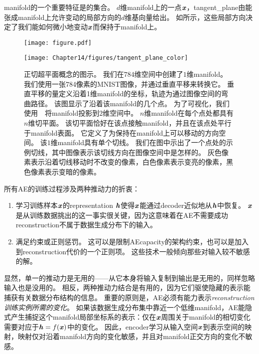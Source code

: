 \gls{manifold}的一个重要特征是的集合。
$d$维\gls{manifold}上的一点$\boldsymbol{\mathit{x}}$，\gls{tangent_plane}由能张成\gls{manifold}上允许变动的局部方向的$d$维基向量给出。
如所示，这些局部方向决定了我们能如何微小地变动$\boldsymbol{\mathit{x}}$而保持于\gls{manifold}上。

\begin{figure}[!htb]
\ifOpenSource
\centerline{\texttt{[image: figure.pdf]}}
\else
\centerline{\texttt{[image: Chapter14/figures/tangent\_plane\_color]}}
\fi
\caption{正切超平面概念的图示。
我们在$784$维空间中创建了$1$维\gls{manifold}。
我们使用一张784像素的MNIST图像，并通过垂直平移来转换它。
垂直平移的量定义沿着1维\gls{manifold}的坐标，轨迹为通过图像空间的弯曲路径。
该图显示了沿着该\gls{manifold}的几个点。
为了可视化，我们使用~~将\gls{manifold}投影到$2$维空间中。
$n$维\gls{manifold}在每个点处都具有$n$维切平面。
该切平面恰好在该点接触\gls{manifold}，并且在该点处平行于\gls{manifold}表面。
它定义了为保持在\gls{manifold}上可以移动的方向空间。
该$1$维\gls{manifold}具有单个切线。
我们在图中示出了一个点处的示例切线，其中图像表示该切线方向在图像空间中是怎样的。
灰色像素表示沿着切线移动时不改变的像素，白色像素表示变亮的像素，黑色像素表示变暗的像素。
}
\label{fig:chap14_tangent_plane_color}
\end{figure}


所有\gls{AE}的训练过程涉及两种推动力的折衷：
\begin{enumerate}
 \item 学习训练样本$\boldsymbol{\mathit{x}}$的\gls{representation} $\boldsymbol{\mathit{h}}$使得$\boldsymbol{\mathit{x}}$能通过\gls{decoder}近似地从$\boldsymbol{\mathit{h}}$中恢复。
$\boldsymbol{\mathit{x}}$是从训练数据挑出的这一事实很关键，因为这意味着在\gls{AE}不需要成功\gls{reconstruction}不属于数据生成分布下的输入。
 \item 满足约束或正则惩罚。
这可以是限制\gls{AE}\gls{capacity}的架构约束，也可以是加入到\gls{reconstruction}代价的一个正则项。
这些技术一般倾向那些对输入较不敏感的解。
\end{enumerate}


显然，单一的推动力是无用的——从它本身将输入复制到输出是无用的，同样忽略输入也是没用的。
相反，两种推动力结合是有用的，因为它们驱使隐藏的表示能捕获有关数据分布结构的信息。
重要的原则是，\gls{AE}必须有能力表示\emph{\gls{reconstruction}训练实例所需的变化}。
如果该数据生成分布集中靠近一个低维\gls{manifold}，\gls{AE}能隐式产生捕捉这个\gls{manifold}局部坐标系的表示：仅在$\boldsymbol{\mathit{x}}$周围关于\gls{manifold}的相切变化需要对应于$\boldsymbol{\mathit{h}}=f(\boldsymbol{\mathit{x}})$中的变化。
因此，\gls{encoder}学习从输入空间$\boldsymbol{\mathit{x}}$到表示空间的映射，映射仅对沿着\gls{manifold}方向的变化敏感，并且对\gls{manifold}正交方向的变化不敏感。


